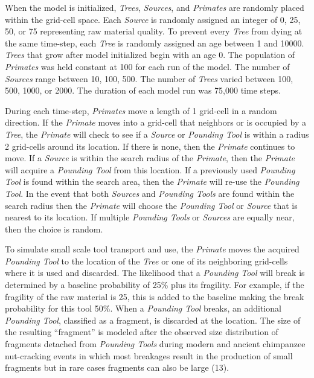 \documentclass[9pt,twocolumn,twoside,]{pnas-new}
\begin{document}
When the model is initialized, \emph{Trees}, \emph{Sources}, and
\emph{Primates} are randomly placed within the grid-cell space. Each
\emph{Source} is randomly assigned an integer of 0, 25, 50, or 75
representing raw material quality. To prevent every \emph{Tree} from
dying at the same time-step, each \emph{Tree} is randomly assigned an
age between 1 and 10000. \emph{Trees} that grow after model initialized
begin with an age 0. The population of \emph{Primates} was held constant
at 100 for each run of the model. The number of \emph{Sources} range
between 10, 100, 500. The number of \emph{Trees} varied between 100,
500, 1000, or 2000. The duration of each model run was 75,000 time
steps.

During each time-step, \emph{Primates} move a length of 1 grid-cell in a
random direction. If the \emph{Primate} moves into a grid-cell that
neighbors or is occupied by a \emph{Tree}, the \emph{Primate} will check
to see if a \emph{Source} or \emph{Pounding Tool} is within a radius 2
grid-cells around its location. If there is none, then the
\emph{Primate} continues to move. If a \emph{Source} is within the
search radius of the \emph{Primate}, then the \emph{Primate} will
acquire a \emph{Pounding Tool} from this location. If a previously used
\emph{Pounding Tool} is found within the search area, then the
\emph{Primate} will re-use the \emph{Pounding Tool}. In the event that
both \emph{Sources} and \emph{Pounding Tools} are found within the
search radius then the \emph{Primate} will choose the \emph{Pounding
Tool} or \emph{Source} that is nearest to its location. If multiple
\emph{Pounding Tools} or \emph{Sources} are equally near, then the
choice is random.

To simulate small scale tool transport and use, the \emph{Primate} moves
the acquired \emph{Pounding Tool} to the location of the \emph{Tree} or
one of its neighboring grid-cells where it is used and discarded. The
likelihood that a \emph{Pounding Tool} will break is determined by a
baseline probability of 25\% plus its fragility. For example, if the
fragility of the raw material is 25, this is added to the baseline
making the break probability for this tool 50\%. When a \emph{Pounding
Tool} breaks, an additional \emph{Pounding Tool}, classified as a
fragment, is discarded at the location. The size of the resulting
``fragment'' is modeled after the observed size distribution of
fragments detached from \emph{Pounding Tools} during modern and ancient
chimpanzee nut-cracking events in which most breakages result in the
production of small fragments but in rare cases fragments can also be
large (13).
\end{document}
